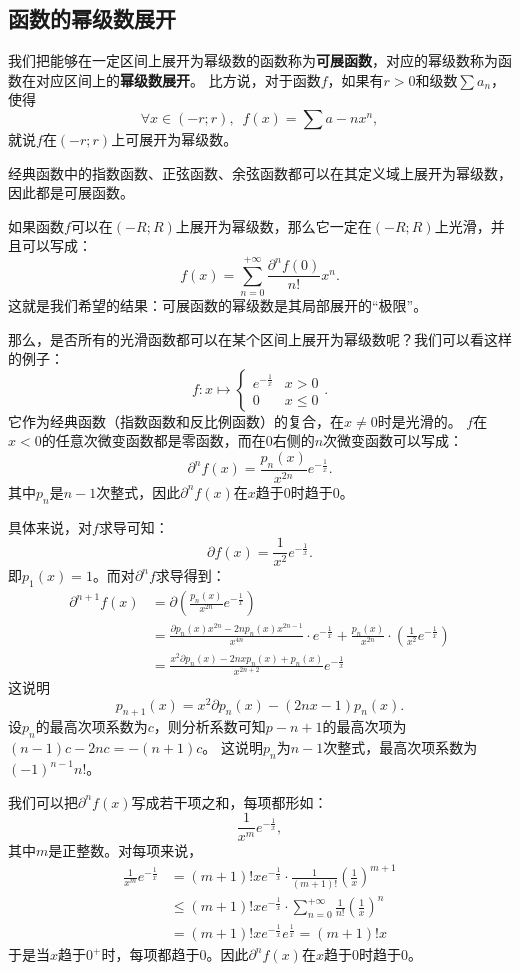 \documentclass[12pt,UTF8]{ctexbook}
\theoremstyle{definition}
\theoremstyle{plain}
\begin{document}
\begin{appendix}
\section{函数的幂级数展开}

我们把能够在一定区间上展开为幂级数的函数称为\textbf{可展函数}，对应的幂级数称为函数在对应区间上的\textbf{幂级数展开}。
比方说，对于函数$f$，如果有$r>0$和级数$\sum a_n$，使得
$$\forall x\in (-r;r),\,\,\, f(x) = \sum a-n x^n,$$
就说$f$在$(-r;r)$上可展开为幂级数。

经典函数中的指数函数、正弦函数、余弦函数都可以在其定义域上展开为幂级数，因此都是可展函数。

如果函数$f$可以在$(-R;R)$上展开为幂级数，那么它一定在$(-R;R)$上光滑，并且可以写成：
$$ f(x) = \sum_{n=0}^{+\infty} \frac{\partial^n f(0)}{n!} x^n. $$
这就是我们希望的结果：可展函数的幂级数是其局部展开的“极限”。

那么，是否所有的光滑函数都可以在某个区间上展开为幂级数呢？我们可以看这样的例子：
$$ f: x\mapsto \begin{cases} e^{-\frac{1}{x}} & x > 0 \\ 0 & x \leqslant 0 \end{cases}.$$
它作为经典函数（指数函数和反比例函数）的复合，在$x\neq 0$时是光滑的。
$f$在$x<0$的任意次微变函数都是零函数，而在$0$右侧的$n$次微变函数可以写成：
$$ \partial^n f(x) = \frac{p_n(x)}{x^{2n}} e^{-\frac{1}{x}}.$$
其中$p_n$是$n-1$次整式，因此$\partial^n f(x)$在$x$趋于$0$时趋于$0$。

具体来说，对$f$求导可知：
$$ \partial f(x) = \frac{1}{x^{2}} e^{-\frac{1}{x}}. $$
即$p_1(x) = 1$。而对$\partial^n f$求导得到：
\begin{align*}
    \partial^{n+1} f(x) &= \partial \left(\frac{p_n(x)}{x^{2n}} e^{-\frac{1}{x}}\right) \\
    &= \frac{\partial p_n(x) x^{2n} - 2n p_n(x) x^{2n-1}}{x^{4n}} \cdot e^{-\frac{1}{x}} + \frac{p_n(x)}{x^{2n}} \cdot \left( \frac{1}{x^{2}} e^{-\frac{1}{x}}\right) \\
    &= \frac{x^2 \partial p_n(x) - 2nx p_n(x) + p_n(x)}{x^{2n+2}} e^{-\frac{1}{x}}
\end{align*}
这说明
$$ p_{n+1}(x) = x^2 \partial p_n(x) - (2nx - 1)p_n(x).$$
设$p_n$的最高次项系数为$c$，则分析系数可知$p-{n+1}$的最高次项为$(n-1)c - 2nc = -(n+1)c$。
这说明$p_n$为$n-1$次整式，最高次项系数为$(-1)^{n-1}n!$。

我们可以把$\partial^n f(x)$写成若干项之和，每项都形如：
$$ \frac{1}{x^m} e^{-\frac{1}{x}},$$
其中$m$是正整数。对每项来说，
\begin{align*}
    \frac{1}{x^m} e^{-\frac{1}{x}} &= (m+1)!x e^{-\frac{1}{x}} \cdot \frac{1}{(m+1)!} \left(\frac{1}{x}\right)^{m+1} \\
    &\leqslant (m+1)!x e^{-\frac{1}{x}} \cdot \sum_{n=0}^{+\infty} \frac{1}{n!} \left(\frac{1}{x}\right)^n \\
    &= (m+1)!x e^{-\frac{1}{x}} e^{\frac{1}{x}} = (m+1)!x
\end{align*}
于是当$x$趋于$0^+$时，每项都趋于$0$。因此$\partial^n f(x)$在$x$趋于$0$时趋于$0$。


\end{appendix}
\end{document}
